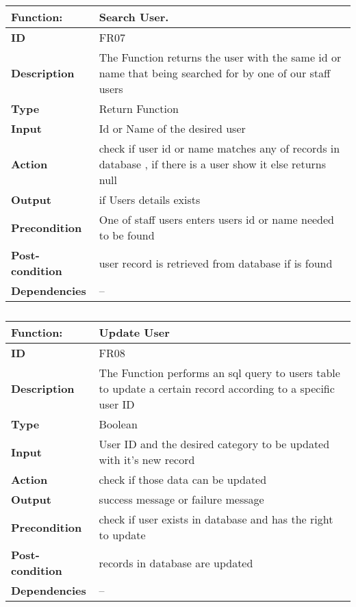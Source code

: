 \documentclass[]{article}
\begin{document}
\FloatBarrier
\begin{table}[h]
\caption{}
\label{tab:my-table}
\begin{tabular}{|p{}|p{}|}
\hline
\textbf{Function:} & Search User.
\\ \hline
\textbf{ID}  & FR07           
\\ \hline
\textbf{Description} & The Function returns the user with the same id or name that being searched for by one of our staff users                                              
\\ \hline
\textbf{Type}  & Return Function        

\\ \hline
\textbf{Input}  & Id or Name of the desired user 

\\ \hline
\textbf{Action} & check if user id or name matches any of records in database , if there is a user show it else returns null
\\ \hline
\textbf{Output} & if Users details exists
\\ \hline
\textbf{Precondition}   &   One of staff users enters users id or name needed to be found
\\ \hline
\textbf{Post-condition} & user record is retrieved from database if is found 
\\ \hline
\textbf{Dependencies} & -- 
\\ \hline
\end{tabular}
\end{table}

\FloatBarrier
\begin{table}[h]
\caption{}
\label{tab:my-table}
\begin{tabular}{|p{}|p{}|}
\hline
\textbf{Function:} & Update User
\\ \hline
\textbf{ID}  &  FR08          
\\ \hline
\textbf{Description} & The Function performs an sql query to users table to update a certain record according to a specific user ID                                                     
\\ \hline
\textbf{Type}    &  Boolean       

\\ \hline
\textbf{Input}  & User ID and the desired category to be updated with it's new record  
\\ \hline
\textbf{Action} & check if those data can be updated 
\\ \hline
\textbf{Output}  & success message or failure message  
\\ \hline
\textbf{Precondition}  &  check if user exists in database and has the right to update 

\\ \hline
\textbf{Post-condition} & records in database are updated  
\\ \hline
\textbf{Dependencies}    & -- 
\\ \hline
\end{tabular}
\end{table}
\end{document}

